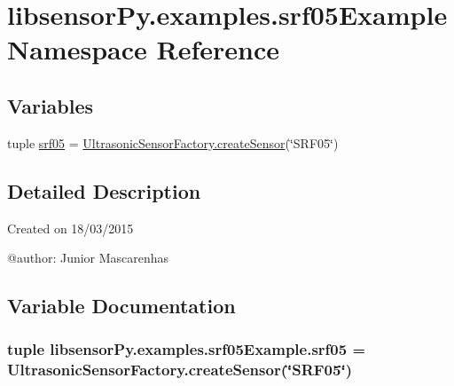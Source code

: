 \hypertarget{namespacelibsensorPy_1_1examples_1_1srf05Example}{}\section{libsensor\+Py.\+examples.\+srf05\+Example Namespace Reference}
\label{namespacelibsensorPy_1_1examples_1_1srf05Example}
\subsection*{Variables}
\begin{DoxyCompactItemize}
\item 
tuple \hyperlink{namespacelibsensorPy_1_1examples_1_1srf05Example_a5894d858423241c4f75204b309dd49b5}{srf05} = \hyperlink{classconcretefactory_1_1ultrasonicSensorFactory_1_1UltrasonicSensorFactory_ade21ba1ce348eb9e5cf8eee3fda4a773}{Ultrasonic\+Sensor\+Factory.\+create\+Sensor}(\char`\"{}S\+R\+F05\char`\"{})
\end{DoxyCompactItemize}


\subsection{Detailed Description}
\begin{DoxyVerb}Created on 18/03/2015

@author: Junior Mascarenhas
\end{DoxyVerb}
 

\subsection{Variable Documentation}
\hypertarget{namespacelibsensorPy_1_1examples_1_1srf05Example_a5894d858423241c4f75204b309dd49b5}{}
\subsubsection[{srf05}]{\setlength{\rightskip}{0pt plus 5cm}tuple libsensor\+Py.\+examples.\+srf05\+Example.\+srf05 = {\bf Ultrasonic\+Sensor\+Factory.\+create\+Sensor}(\char`\"{}S\+R\+F05\char`\"{})}\label{namespacelibsensorPy_1_1examples_1_1srf05Example_a5894d858423241c4f75204b309dd49b5}
